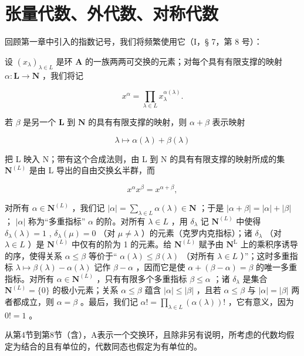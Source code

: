\chapter{张量代数、外代数、对称代数}

回顾第一章中引入的指数记号，我们将频繁使用它（I，§ 7，第 8 号）：

设 \((x_{\lambda})_{\lambda \in L}\) 是环 \(\mathbf{A}\) 的一族两两可交换的元素；对每个具有有限支撑的映射 \(\alpha: \mathbf{L} \to \mathbf{N}\) ，我们将记

\[
x ^ {\alpha} = \prod_ {\lambda \in L} x _ {\lambda} ^ {\alpha (\lambda)}.
\]

若 \(\beta\) 是另一个 \(\mathbf{L}\) 到 \(\mathbf{N}\) 的具有有限支撑的映射，则 \(\alpha + \beta\) 表示映射

\[
\lambda \mapsto \alpha (\lambda) + \beta (\lambda)
\]

把 L 映入 N；带有这个合成法则，由 L 到 N 的具有有限支撑的映射所成的集 \(\mathbf{N}^{(L)}\) 是由 L 导出的自由交换幺半群，而

\[
x ^ {\alpha} x ^ {\beta} = x ^ {\alpha + \beta},
\]

对所有 \(\alpha \in \mathbf{N}^{(L)}\) ，我们记 \(|\alpha| = \sum_{\lambda \in L} \alpha(\lambda) \in \mathbf{N}\) ；于是 \(|\alpha + \beta| = |\alpha| + |\beta|\) ； \(|\alpha|\) 称为“多重指标” \(\alpha\) 的阶。对所有 \(\lambda \in L\) ，用 \(\delta_{\lambda}\) 记 \(\mathbf{N}^{(L)}\) 中使得 \(\delta_{\lambda}(\lambda) = 1\) , \(\delta_{\lambda}(\mu) = 0\) （对 \(\mu \neq \lambda\) ）的元素（克罗内克指标）；诸 \(\delta_{\lambda}\) （对 \(\lambda \in L\) ）是 \(\mathbf{N}^{(L)}\) 中仅有的阶为 1 的元素。给 \(\mathbf{N}^{(L)}\) 赋予由 \(\mathbf{N}^{\mathrm{L}}\) 上的乘积序诱导的序，使得关系 \(\alpha \leqslant \beta\) 等价于“ \(\alpha(\lambda) \leqslant \beta(\lambda)\) （对所有 \(\lambda \in L\) ）”；这时多重指标 \(\lambda \mapsto \beta(\lambda) - \alpha(\lambda)\) 记作 \(\beta - \alpha\) ，因而它是使 \(\alpha + (\beta - \alpha) = \beta\) 的唯一多重指标。对所有 \(\alpha \in \mathbf{N}^{(L)}\) ，只有有限多个多重指标 \(\beta \leqslant \alpha\) ；诸 \(\delta_{\lambda}\) 是集合 \(\mathbf{N}^{(L)} = \{0\}\) 的极小元素；关系 \(\alpha \leqslant \beta\) 蕴含 \(|\alpha| \leqslant |\beta|\) ，且若 \(\alpha \leqslant \beta\) 与 \(|\alpha| = |\beta|\) 两者都成立，则 \(\alpha = \beta\) 。最后，我们记 \(\alpha! = \prod_{\lambda \in L} (\alpha(\lambda))!\) ，它有意义，因为 \(0! = 1\) 。

从第4节到第8节（含），A表示一个交换环，且除非另有说明，所考虑的代数均假定为结合的且有单位的，代数同态也假定为有单位的。

